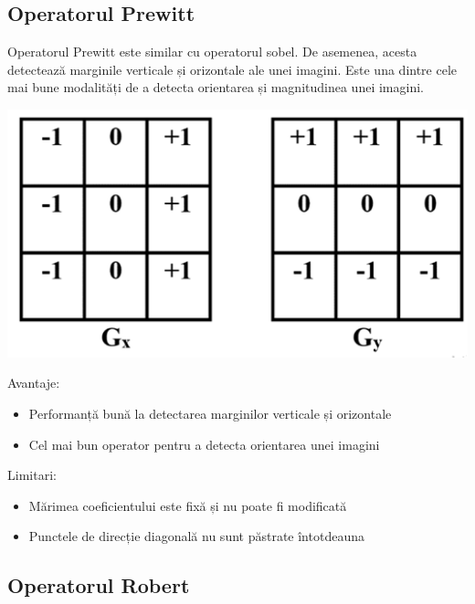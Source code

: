 \documentclass[10pt]{article}
\begin{document}
\newpage

\subsection{Operatorul Prewitt}

\> Operatorul Prewitt este similar cu operatorul sobel. De asemenea, acesta detectează marginile verticale și orizontale ale unei imagini.
Este una dintre cele mai bune modalități de a detecta orientarea și magnitudinea unei imagini.
 
\begin{center}

  \includegraphics[scale=0.5]{prewitt}
  
\end{center}

\> Avantaje:
\begin{itemize}

  \item Performanță bună la detectarea marginilor verticale și orizontale
  \item Cel mai bun operator pentru a detecta orientarea unei imagini

\end{itemize}

\> Limitari:
\begin{itemize}

  \item Mărimea coeficientului este fixă și nu poate fi modificată
  \item Punctele de direcție diagonală nu sunt păstrate întotdeauna
  
\end{itemize}

\newpage


\subsection{Operatorul Robert}
\end{document}

